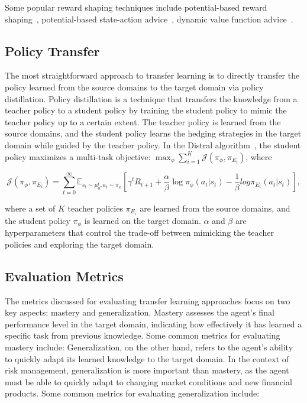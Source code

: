 Some popular reward shaping techniques include potential-based reward shaping~\citep{ng1999policy}, potential-based state-action advice~\citep{wiewiora2003principled}, dynamic value function advice~\citep{harutyunyan2015expressing}.

\subsection{Policy Transfer}

The most straightforward approach to transfer learning is to directly transfer the policy learned from the source domains to the target domain via policy distillation.
Policy distillation is a technique that transfers the knowledge from a teacher policy to a student policy by training the student policy to mimic the teacher policy up to a certain extent.
The teacher policy is learned from the source domains, and the student policy learns the hedging strategies in the target domain while guided by the teacher policy.
In the Distral algorithm~\citep{teh2017distral}, the student policy maximizes a multi-task objective:
$\max_{\phi} \sum_{i=1}^K \mathcal{J}(\pi_\phi, \pi_{E_i})$, where

\begin{equation}
    \mathcal{J}(\pi_\phi, \pi_{E_i}) = \sum_{t=0}^\infty \mathbb{E}_{s_t \sim \mu_0^t, a_t \sim \pi_\phi} \left[ \gamma^t R_{t+1} + \frac{\alpha}{\beta} \log \pi_{\phi}(a_t|s_t) - \frac{1}{\beta}log \pi_{E_i}(a_t|s_t) \right],
\end{equation}

where a set of $K$ teacher policies $\pi_{E_i}$ are learned from the source domains, and the student policy $\pi_\phi$ is learned on the target domain. $\alpha$ and $\beta$ are hyperparameters that control the trade-off between mimicking the teacher policies and exploring the target domain.

\subsection{Evaluation Metrics}

The metrics discussed for evaluating transfer learning approaches focus on two key aspects: mastery and generalization. 
Mastery assesses the agent's final performance level in the target domain, indicating how effectively it has learned a specific task from previous knowledge. 
Some common metrics for evaluating mastery include:
Generalization, on the other hand, refers to the agent's ability to quickly adapt its learned knowledge to the target domain.
In the context of risk management, generalization is more important than mastery, as the agent must be able to quickly adapt to changing market conditions and new financial products.
Some common metrics for evaluating generalization include:

